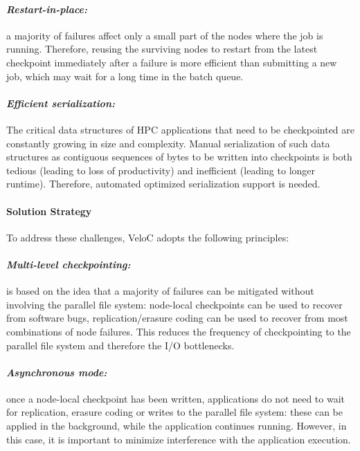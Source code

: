 \paragraph{\emph{Restart-in-place:}} a majority of failures affect
only a small part of the nodes where the job is running. Therefore,
reusing the surviving nodes to restart from the latest checkpoint
immediately after a failure is more efficient than submitting a new job,
which may wait for a long time in the batch queue.
\vspace{-1em}

\paragraph{\emph{Efficient serialization:}} The critical data structures
of HPC applications that need to be checkpointed are constantly
growing in size and complexity. Manual serialization of such data
structures as contiguous sequences of bytes to be written into
checkpoints is both tedious (leading to loss of productivity) and
inefficient (leading to longer runtime). Therefore, automated
optimized serialization support is needed.

\paragraph{Solution Strategy}

To address these challenges, VeloC adopts the following principles:
\vspace{-1em}

\paragraph{\emph{Multi-level checkpointing:}} is based on the idea
that a majority of failures can be mitigated without involving the
parallel file system: node-local checkpoints can be used to recover
from software bugs, replication/erasure coding can be used to recover
from most combinations of node failures. This reduces the frequency of
checkpointing to the parallel file system and therefore the I/O
bottlenecks.
\vspace{-1em}

\paragraph{\emph{Asynchronous mode:}} once a node-local checkpoint has
been written, applications do not need to wait for replication,
erasure coding or writes to the parallel file system: these can be
applied in the background, while the application continues
running. However, in this case, it is important to minimize
interference with the application execution.
\vspace{-1em}

